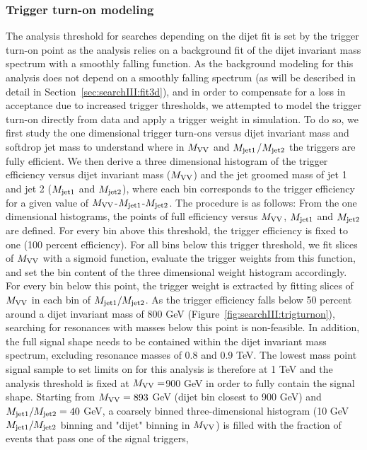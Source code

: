 \subsubsection{Trigger turn-on modeling}
\label{sec:searchIII:triggermodeling}
The analysis threshold for searches depending on the dijet fit is set by the trigger turn-on point as the analysis relies on a background fit of the dijet invariant mass spectrum with a smoothly falling function. As the background modeling for this analysis does not depend on a smoothly falling spectrum (as will be described in detail in Section~\ref{sec:searchIII:fit3d}), and in order to compensate for a loss in acceptance due to increased trigger thresholds, we attempted to model the trigger turn-on directly from data and apply a trigger weight in simulation.
To do so, we first study the one dimensional trigger turn-ons versus dijet invariant mass and softdrop jet mass to understand where in $M_{\rm VV}$ and $M_{\rm jet1}$/$M_{\rm jet2}$ the triggers are fully efficient. We then derive a three dimensional histogram of the trigger efficiency versus dijet invariant mass ($M_{\rm VV}$) and the jet groomed mass of jet 1 and jet 2 ($M_{\rm jet1}$ and $M_{\rm jet2}$), where each bin corresponds to the trigger efficiency for a given value of $M_{\rm VV}$-$M_{\rm jet1}$-$M_{\rm jet2}$. The procedure is as follows: From the one dimensional histograms, the points of full efficiency versus $M_{\rm VV}$, $M_{\rm jet1}$ and $M_{\rm jet2}$
are defined. For every bin above this threshold, the trigger efficiency is fixed to one (100 percent efficiency). For all bins below this trigger threshold, we fit slices of $M_{\rm VV}$ with a sigmoid function, evaluate the trigger weights from this function, and set the bin content of
the three dimensional weight histogram accordingly. For every bin below this point, the trigger weight is extracted by fitting slices of $M_{\rm VV}$ in each bin of $M_{\rm jet1}/M_{\rm jet2}$.
As the trigger efficiency falls below 50 percent around a dijet invariant mass of 800 GeV (Figure~\ref{fig:searchIII:trigturnon}), searching for resonances with masses below this point is non-feasible. In addition, the full signal shape needs to be contained within the dijet invariant mass spectrum, excluding resonance masses of 0.8 and 0.9 TeV. The lowest mass point signal sample to set limits on for this analysis is therefore at 1 TeV and the analysis threshold is fixed at $M_{\rm VV} = $900 GeV in order to fully contain the signal shape.
Starting from $M_{\rm VV}=893$ GeV (dijet bin closest to 900 GeV) and $M_{\rm jet1}/M_{\rm jet2}=40$ GeV, a coarsely binned three-dimensional histogram (10 GeV $M_{\rm jet1}/M_{\rm jet2}$ binning and "dijet" binning in $M_{\rm VV}$) is filled with the fraction of events that pass one of the signal triggers,
